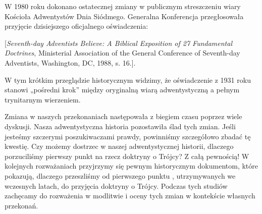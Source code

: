 W 1980 roku dokonano ostatecznej zmiany w publicznym streszczeniu wiary Kościoła Adwentystów Dnia Siódmego. Generalna Konferencja przegłosowała przyjęcie dzisiejszego oficjalnego oświadczenia:

[\textit{Seventh-day Adventists Believe: A Biblical Exposition of 27 Fundamental Doctrines}, Ministerial Association of the General Conference of Seventh-day Adventists, Washington, DC, 1988, s. 16.].

W tym krótkim przeglądzie historycznym widzimy, że oświadczenie z 1931 roku stanowi „pośredni krok” między oryginalną wiarą adwentystyczną a pełnym trynitarnym wierzeniem.

Zmiana w naszych przekonaniach następowała z biegiem czasu poprzez wiele dyskusji. Nasza adwentystyczna historia pozostawiła ślad tych zmian. Jeśli jesteśmy szczerymi poszukiwaczami prawdy, powinniśmy szczegółowo zbadać tę kwestię. Czy możemy dostrzec w naszej adwentystycznej historii, dlaczego porzuciliśmy pierwszy punkt  na rzecz doktryny o Trójcy? Z całą pewnością! W kolejnych rozważaniach przyjrzymy się pewnym historycznym dokumentom, które pokazują, dlaczego przeszliśmy od pierwszego punktu , utrzymywanych we wczesnych latach, do przyjęcia doktryny o Trójcy. Podczas tych studiów zachęcamy do rozważenia w  modlitwie i oceny tych zmian w kontekście własnych przekonań.


